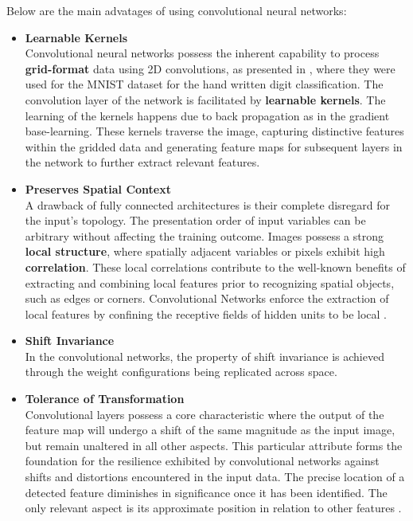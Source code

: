 Below are the main advatages of using convolutional neural networks:
\begin{itemize}
    \item \textbf{Learnable Kernels}\\
          Convolutional neural networks possess the inherent capability to process \textbf{grid-format} data using 2D convolutions, as presented in \cite{LeChun_5}, where they were used for the MNIST dataset\cite{deng2012mnist} for the hand written digit classification.
          The convolution layer of the network is facilitated by \textbf{learnable kernels}. The learning of the kernels happens due to back propagation as in the gradient base-learning.
          These kernels traverse the image, capturing distinctive features within the gridded data and generating feature maps for subsequent layers in the network to further extract relevant features.

\end{itemize}
\begin{itemize}
    \item \textbf{Preserves Spatial Context }\\
          A drawback of fully connected architectures is their complete disregard for the input's topology. The presentation order of input variables can be arbitrary without affecting the training outcome. Images possess a strong \textbf{local structure}, where spatially adjacent variables or pixels exhibit high \textbf{correlation}. These local correlations contribute to the well-known benefits of extracting and combining local features prior to recognizing spatial objects, such as edges or corners. Convolutional Networks enforce the extraction of local features
          by confining the receptive fields of hidden units to be local \cite{LeChun_5}.
\end{itemize}

\begin{itemize}
    \item \textbf{Shift Invariance}\\
          In the convolutional networks, the property of shift invariance is achieved through the weight configurations being replicated across space\cite{LeChun_5}.

\end{itemize}
\begin{itemize}
    \item \textbf{Tolerance of Transformation }\\
          Convolutional layers possess a core characteristic where the output of the feature map will undergo a shift of the same magnitude as the input image, but remain unaltered in all other aspects. This particular attribute forms the foundation for the resilience exhibited by convolutional networks against shifts and distortions encountered in the input data\cite{LeChun_5}.
          The precise location of a detected feature diminishes in significance once it has been identified. The only relevant aspect is its approximate position in relation to other features \cite{LeChun_5}.
\end{itemize}


